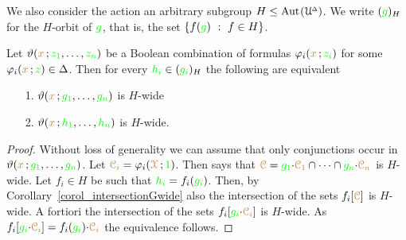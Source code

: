 


We also consider the action an arbitrary subgroup $H\le{\rm Aut\kern.15ex}(\EuScript U\kern-.2ex^{\scriptscriptstyle\Delta})$.
We write \emph{$({\color{green} g})_H$\/} for the $H$-orbit of ${\color{green} g}$, that is, the set $\{f({\color{green} g})\ :\ f\in H\}$.

\begin{proposition}\label{prop_wideHcojugate}
  Let $\vartheta({\color{brown} x}\,;{\color{green} z_1},\dots,{\color{green} z_n})$ be a Boolean combination of formulas $\varphi_i({\color{brown} x}\,;{\color{green} z_i})$ for some $\varphi_i({\color{brown} x}\,;{\color{green} z})\in\Delta$.
  Then for every ${\color{green} h_i}\in({\color{green} g_i})_H$ the following are equivalent
  \begin{itemize}
    \item [1.] $\vartheta({\color{brown} x}\,;{\color{green} g_1},\dots,{\color{green} g_n})$ is $H$-wide
    \item [2.] $\vartheta({\color{brown} x}\,;{\color{green} h_1},\dots,{\color{green} h_n})$ is $H$-wide.
  \end{itemize}
\end{proposition}

\begin{proof}
  Without loss of generality we can assume that only conjunctions occur in $\vartheta({\color{brown} x}\,;{\color{green} g_1},\dots,{\color{green} g_n})$.
  Let ${\color{brown}\EuScript C_i}=\varphi_i({\color{brown}\EuScript X}\,;{\color{green} 1})$.
  Then  says that ${\color{brown}\EuScript C}={\color{green} g_1}{\cdot}{\color{brown}\EuScript C_1}\cap\dots\cap{\color{green}g_n}{\cdot}{\color{brown}\EuScript C_n}$ is $H$-wide.
  Let $f_i\in H$ be such that ${\color{green} h_i}=f_i({\color{green} g_i})$.
  Then, by Corollary~\ref{corol_intersectionGwide} also the intersection of the sets $f_i[{\color{brown}\EuScript C}]$ is $H$-wide.
  A fortiori the intersection of the sets $f_i[{\color{green} g_i}{\cdot}{\color{brown}\EuScript C_i}]$ is $H$-wide.
  As $f_i[{\color{green} g_i}{\cdot}{\color{brown}\EuScript C_i}]=f_i({\color{green} g_i}){\cdot}{\color{brown}\EuScript C_i}$ the equivalence follows.
\end{proof}

